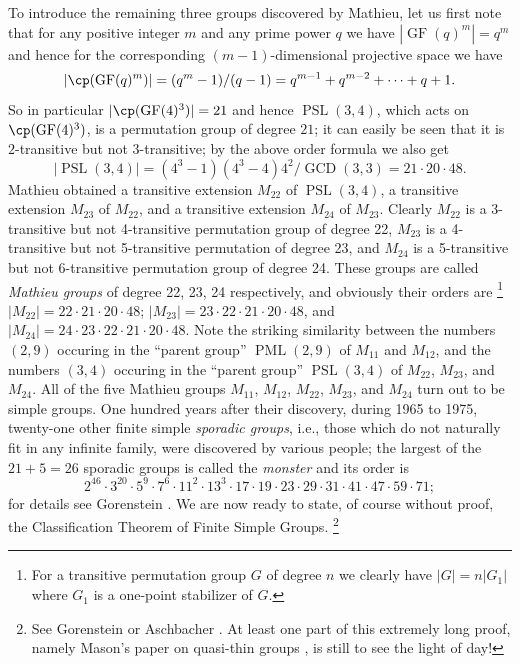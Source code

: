 To introduce the remaining three groups discovered by 
Mathieu, let us first
note that for any positive integer $m$ and any prime power 
$q$ we have 
$|\operatorname{GF}(q)^m|
=q^m$ and hence for the corresponding $(m-1)$-dimensional
projective space we have
$$
|\cp(\operatorname{GF}(q)^m)|=(q^m-1)/(q-1)=q^{m-1}+
q^{m-2}+\cdots+q+1.
$$
So in particular $|\cp(\operatorname{GF}(4)^3)|=21$ and 
hence $\operatorname{PSL}(3,4)$, 
which acts on$\cp
(\operatorname{GF}(4)^3)$, is a permutation group of 
degree $21$; it can easily be seen
that it is $2$-transitive but not $3$-transitive; 
by the above order formula we also get
$$
|\operatorname{PSL}(3,4)|=(4^3-1)(4^3-4)4^2/%
\operatorname{GCD}(3,3)=21\cdot 20\cdot 48.
$$
Mathieu obtained a transitive extension $M_{22}$ of 
$\operatorname{PSL}(3,4)$, a transitive
extension $M_{23}$ of $M_{22}$, and a transitive extension 
$M_{24}$ of
$M_{23}$. Clearly $M_{22}$ is a 3-transitive but not 
4-transitive permutation group of degree 22, 
$M_{23}$ is a 4-transitive but not 5-transitive 
permutation of 
degree 23, and $M_{24}$ is
a 5-transitive but not 6-transitive permutation group of 
degree 24. 
These groups are called {\it Mathieu groups} of degree 22, 
23, 24
respectively, and obviously their orders are
\footnote{For a transitive permutation group $G$ of degree 
$n$ we clearly
have $|G|=n|G_1|$ where $G_1$ is a one-point stabilizer of 
$G$.}
$|M_{22}| = 22 \cdot 21 \cdot 20 \cdot 48$;
$|M_{23}| = 23 \cdot
22 \cdot 21 \cdot 20 \cdot 48$,
 and $|M_{24}| = 24 \cdot 23 \cdot 
22 \cdot 21 \cdot 20\cdot 48$. 
Note the striking similarity between the numbers $(2,9)$ 
occuring in the
``parent group'' $\operatorname{PML}(2,9)$ of $M_{11}$ and 
$M_{12}$, and the numbers $(3,4)$
occuring in the ``parent group'' $\operatorname{PSL}(3,4)$ 
of $M_{22}$,
$M_{23}$, and $M_{24}$.
All of the five Mathieu groups $M_{11}$, $M_{12}$, 
$M_{22}$, $M_{23}$, 
and $M_{24}$
turn out to be simple groups.  One hundred years after 
their discovery, 
during 1965 to 1975, twenty-one other finite simple {\it 
sporadic groups}, 
i.e., those which do not naturally fit in any infinite 
family, were
discovered by various people; the  
largest of the $21+5=26$ sporadic groups is called the 
{\it monster}
and its order is
$$
2^{46}\cdot 3^{20}\cdot 5^9\cdot 7^6\cdot 11^2\cdot 
13^3\cdot 17\cdot 
19\cdot 23\cdot 29\cdot 31\cdot 41\cdot 47\cdot 59\cdot 71;
$$
for details see Gorenstein \cite{G1}. 
We are now
ready to state, of course without proof, the 
Classification Theorem
of Finite Simple Groups.
\footnote{See Gorenstein \cite{G2} or Aschbacher 
\cite{As}. At least one
part of this extremely long proof, namely Mason's paper on 
quasi-thin
groups \cite{Mas}, is still to see the light of day!} 
